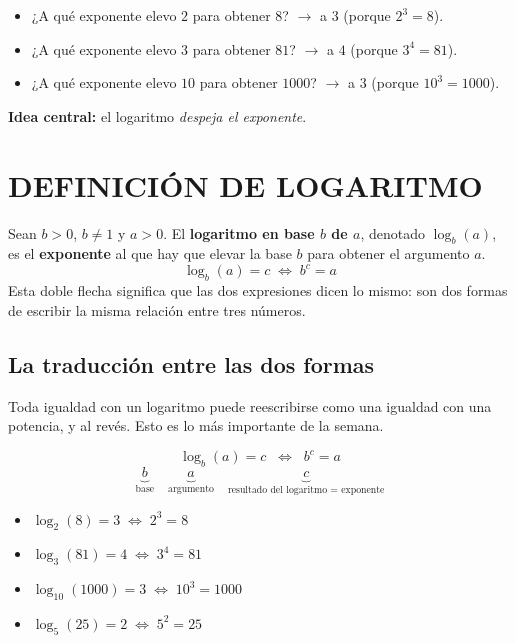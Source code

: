 \documentclass[11pt,a4paper]{article}
\begin{document}
\begin{tcolorbox}[ejemplo, title=Tres preguntas del mismo tipo]
\begin{itemize}[nosep]
  \item ¿A qué exponente elevo $2$ para obtener $8$? $\longrightarrow$ a $3$ (porque $2^3 = 8$).
  \item ¿A qué exponente elevo $3$ para obtener $81$? $\longrightarrow$ a $4$ (porque $3^4 = 81$).
  \item ¿A qué exponente elevo $10$ para obtener $1000$? $\longrightarrow$ a $3$ (porque $10^3 = 1000$).
\end{itemize}
\end{tcolorbox}

\noindent\textbf{Idea central:} el logaritmo \emph{despeja el exponente}.

\section{DEFINICIÓN DE LOGARITMO}

\begin{tcolorbox}[definicion, title=Definición]
Sean $b > 0$, $b \ne 1$ y $a > 0$. El \textbf{logaritmo en base $b$ de $a$}, denotado $\log_b(a)$, es el \textbf{exponente} al que hay que elevar la base $b$ para obtener el argumento $a$.
\[
  \boxed{\; \log_b(a) = c \;\iff\; b^{c} = a \;}
\]
Esta doble flecha significa que las dos expresiones dicen lo mismo: son dos formas de escribir la misma relación entre tres números.
\end{tcolorbox}

\subsection{La traducción entre las dos formas}

Toda igualdad con un logaritmo puede reescribirse como una igualdad con una potencia, y al revés. Esto es lo más importante de la semana.

\begin{tcolorbox}[formula]
\[
  \log_b(a) = c \;\;\Longleftrightarrow\;\; b^{c} = a
\]
\[
  \underbrace{b}_{\text{base}} \quad \underbrace{a}_{\text{argumento}} \quad \underbrace{c}_{\text{resultado del logaritmo } = \text{ exponente}}
\]
\end{tcolorbox}

\begin{tcolorbox}[ejemplo, title=Traducir en ambas direcciones]
\begin{itemize}[nosep]
  \item $\log_2(8) = 3 \;\iff\; 2^{3} = 8$
  \item $\log_3(81) = 4 \;\iff\; 3^{4} = 81$
  \item $\log_{10}(1000) = 3 \;\iff\; 10^{3} = 1000$
  \item $\log_5(25) = 2 \;\iff\; 5^{2} = 25$
\end{itemize}
\end{tcolorbox}
\end{document}

